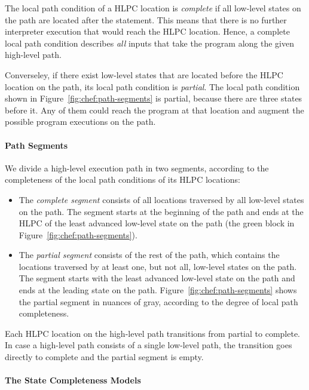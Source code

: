 The local path condition of a HLPC location is \emph{complete} if all low-level states on the path are located after the statement.
%
This means that there is no further interpreter execution that would reach the HLPC location.
%
Hence, a complete local path condition describes \emph{all} inputs that take the program along the given high-level path.

Converseley, if there exist low-level states that are located before the HLPC location on the path, its local path condition is \emph{partial}.
%
The local path condition shown in Figure~\ref{fig:chef:path-segments} is partial, because there are three states before it.
%
Any of them could reach the program at that location and augment the possible program executions on the path.

\paragraph{Path Segments}

We divide a high-level execution path in two segments, according to the completeness of the local path conditions of its HLPC locations:
\begin{itemize}
\item The \emph{complete segment} consists of all locations traversed by all low-level states on the path.
%
The segment starts at the beginning of the path and ends at the HLPC of the least advanced low-level state on the path (the green block in Figure~\ref{fig:chef:path-segments}).
\item The \emph{partial segment} consists of the rest of the path, which contains the locations traversed by at least one, but not all, low-level states on the path.
%
The segment starts with the least advanced low-level state on the path and ends at the leading state on the path.  Figure~\ref{fig:chef:path-segments} shows the partial segment in nuances of gray, according to the degree of local path completeness.
\end{itemize}

Each HLPC location on the high-level path transitions from partial to complete.
%
In case a high-level path consists of a single low-level path, the transition goes directly to complete and the partial segment is empty.

\paragraph{The State Completeness Models}

